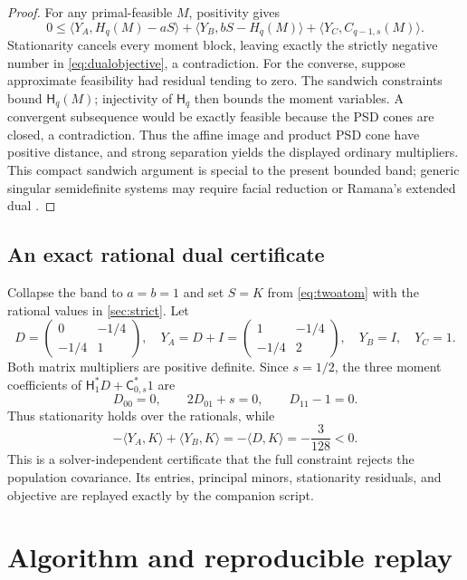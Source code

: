 \documentclass[11pt]{article}
\newcommand{\ip}[2]{\langle #1,#2\rangle}
\begin{document}
\begin{proof}
For any primal-feasible $M$, positivity gives
\[
 0\le \ip{Y_A}{H_q(M)-aS}+\ip{Y_B}{bS-H_q(M)}
       +\ip{Y_C}{C_{q-1,s}(M)}.                                  \tag{9.4}
\]
Stationarity cancels every moment block, leaving exactly the strictly
negative number in \cref{eq:dualobjective}, a contradiction.  For the
converse, suppose approximate feasibility had residual tending to zero.  The
sandwich constraints bound $\mathsf H_q(M)$; injectivity of $\mathsf H_q$ then
bounds the moment variables.  A convergent subsequence would be exactly
feasible because the PSD cones are closed, a contradiction.  Thus the affine
image and product PSD cone have positive distance, and strong separation
yields the displayed ordinary multipliers.  This compact sandwich argument
is special to the present bounded band; generic singular semidefinite systems
may require facial reduction or Ramana's extended dual \cite{Ramana1997}.
\end{proof}

\subsection{An exact rational dual certificate}

Collapse the band to $a=b=1$ and set $S=K$ from \cref{eq:twoatom} with the
rational values in \cref{sec:strict}.  Let
\[
 D=\begin{pmatrix}0&-1/4\\-1/4&1\end{pmatrix},\quad
 Y_A=D+I=\begin{pmatrix}1&-1/4\\-1/4&2\end{pmatrix},\quad
 Y_B=I,\quad Y_C=1.                                               \tag{9.5}
\]
Both matrix multipliers are positive definite.  Since $s=1/2$,
the three moment coefficients of
$\mathsf H_1^*D+\mathsf C_{0,s}^*1$ are
\[
 D_{00}=0,\qquad 2D_{01}+s=0,\qquad D_{11}-1=0.                  \tag{9.6}
\]
Thus stationarity holds over the rationals, while
\[
 -\ip{Y_A}{K}+\ip{Y_B}{K}=-\ip D K=-\frac3{128}<0.              \tag{9.7}
\]
This is a solver-independent certificate that the full constraint rejects
the population covariance.  Its entries, principal minors, stationarity
residuals, and objective are replayed exactly by the companion script.

\section{Algorithm and reproducible replay}\label{sec:algorithm}
\end{document}
